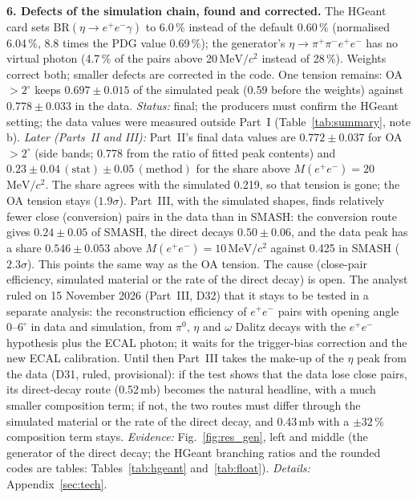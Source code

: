 \documentclass[11pt,a4paper]{article}
\newcommand{\piz}{\ensuremath{\pi^{0}}\xspace}
\newcommand{\ee}{\ensuremath{e^{+}e^{-}}\xspace}
\newcommand{\ppee}{\ensuremath{\pi^{+}\pi^{-}e^{+}e^{-}}\xspace}
\newcommand{\Mee}{\ensuremath{M(e^{+}e^{-})}\xspace}
\newcommand{\MeVcc}{\ensuremath{\mathrm{MeV}/c^{2}}\xspace}
\begin{document}
\textbf{6. Defects of the simulation chain, found and corrected.} The HGeant card sets $\mathrm{BR}(\eta\to\ee\gamma)$ to
6.0\,\% instead of the default 0.60\,\% (normalised 6.04\,\%, 8.8 times the PDG value 0.69\,\%); the generator's
$\eta\to\ppee$ has no virtual photon (4.7\,\% of the pairs above 20\,\MeVcc instead of 28\,\%). Weights correct both;
smaller defects are corrected in the code. One tension remains: OA$>2^\circ$ keeps $0.697\pm0.015$ of the simulated
peak (0.59 before the weights) against $0.778\pm0.033$ in the data. \emph{Status:} final; the producers must confirm
the HGeant setting; the data values were measured outside Part~I (Table~\ref{tab:summary}, note b).
\emph{Later (Parts~II and III):} Part~II's final data values are $0.772\pm0.037$ for OA$>2^\circ$ (side bands; 0.778 from
the ratio of fitted peak contents) and $0.23\pm0.04\,(\mathrm{stat})\pm0.05\,(\mathrm{method})$ for the share above
$\Mee=20$\,\MeVcc. The share agrees with the simulated 0.219, so that tension is gone; the OA tension stays
($1.9\sigma$). Part~III, with the simulated shapes, finds relatively fewer close (conversion) pairs in the data than in
SMASH: the conversion route gives $0.24\pm0.05$ of SMASH, the direct decays $0.50\pm0.06$, and the data peak has a share
$0.546\pm0.053$ above $\Mee=10$\,\MeVcc against 0.425 in SMASH ($2.3\sigma$). This points the same way as the OA tension.
The cause (close-pair efficiency, simulated material or the rate of the direct decay) is open. The analyst ruled on
15 November 2026 (Part~III, D32) that it stays to be tested in a separate analysis: the reconstruction efficiency of \ee
pairs with opening angle 0--$6^\circ$ in data and simulation, from \piz, $\eta$ and $\omega$ Dalitz decays with the \ee
hypothesis plus the ECAL photon; it waits for the trigger-bias correction and the new ECAL calibration. Until then
Part~III takes the make-up of the $\eta$ peak from the data (D31, ruled, provisional): if the test shows that the data lose
close pairs, its direct-decay route (0.52\,mb) becomes the natural headline, with a much smaller composition term; if not,
the two routes must differ through the simulated material or the rate of the direct decay, and 0.43\,mb with a $\pm32$\,\%
composition term stays.
\emph{Evidence:} Fig.~\ref{fig:res_gen}, left and middle (the generator of the direct decay; the HGeant branching ratios and the rounded
codes are tables: Tables~\ref{tab:hgeant} and~\ref{tab:float}). \emph{Details:} Appendix~\ref{sec:tech}.
\end{document}

